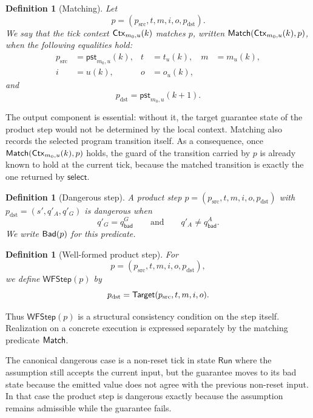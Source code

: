 \documentclass[acmsmall,screen]{acmart}
\theoremstyle{leftplain}
\theoremstyle{leftdefinition}
\newtheorem{definition}[theorem]{Definition}
\theoremstyle{leftremark}
\begin{document}
\begin{definition}[Matching]
Let
\[
  p=(p_{\mathrm{src}}, t, m, i, o, p_{\mathrm{dst}}).
\]
We say that the tick context $\mathsf{Ctx}_{m_0,u}(k)$ matches $p$, written
$\mathsf{Match}(\mathsf{Ctx}_{m_0,u}(k),p)$, when the following equalities hold:
\begin{align*}
  p_{\mathrm{src}} &= \mathsf{pst}_{m_0,u}(k), & t &= t_u(k), & m &= m_u(k), \\
  i &= u(k),                                   & o &= o_u(k),
\end{align*}
and
\[
  p_{\mathrm{dst}} = \mathsf{pst}_{m_0,u}(k+1).
\]
\end{definition}

The output component is essential: without it, the target guarantee state of
the product step would not be determined by the local context.
Matching also records the selected program transition itself. As a consequence,
once $\mathsf{Match}(\mathsf{Ctx}_{m_0,u}(k),p)$ holds, the guard of the transition carried by
$p$ is already known to hold at the current tick, because the matched
transition is exactly the one returned by $\mathsf{select}$.

\begin{definition}[Dangerous step]
A product step
$p=(p_{\mathrm{src}}, t, m, i, o, p_{\mathrm{dst}})$ with
$p_{\mathrm{dst}}=(s',q'_A,q'_G)$ is dangerous when
\[
  q'_G = q^G_{\mathsf{bad}}
  \qquad\text{and}\qquad
  q'_A \neq q^A_{\mathsf{bad}}.
\]
We write $\mathsf{Bad}(p)$ for this predicate.
\end{definition}

\begin{definition}[Well-formed product step]
For
\[
  p=(p_{\mathrm{src}}, t, m, i, o, p_{\mathrm{dst}}),
\]
we define $\mathsf{WFStep}(p)$ by
\[
  p_{\mathrm{dst}} = \mathsf{Target}(p_{\mathrm{src}},t,m,i,o).
\]
\end{definition}

Thus $\mathsf{WFStep}(p)$ is a structural consistency condition on the step
itself. Realization on a concrete execution is expressed separately by the
matching predicate $\mathsf{Match}$.

\noindent{}
The canonical dangerous case is a non-reset tick in state $\mathsf{Run}$ where
the assumption still accepts the current input, but the guarantee moves to its
bad state because the emitted value does not agree with the previous
non-reset input. In that case the product step is dangerous exactly because the
assumption remains admissible while the guarantee fails.
\end{document}
